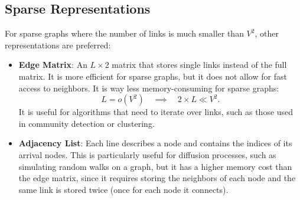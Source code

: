 \subsection{Sparse Representations}
For sparse graphs where the number of links is much smaller than $V^2$, other representations are preferred:
\begin{itemize}
    \item \textbf{Edge Matrix}: An $L \times 2$ matrix that stores single links instead of the full matrix. It is more efficient for sparse graphs, but it does not allow for fast access to neighbors. It is way less memory-consuming for sparse graphs:
          \[
              L = o(V^2) \quad \implies \quad 2\times L \ll V^2.
          \]
          It is useful for algorithms that need to iterate over links, such as those used in community detection or clustering.
    \item \textbf{Adjacency List}: Each line describes a node and contains the indices of its arrival nodes. This is particularly useful for diffusion processes, such as simulating random walks on a graph, but it has a higher memory cost than the edge matrix, since it requires storing the neighbors of each node and the same link is stored twice (once for each node it connects).
\end{itemize}

